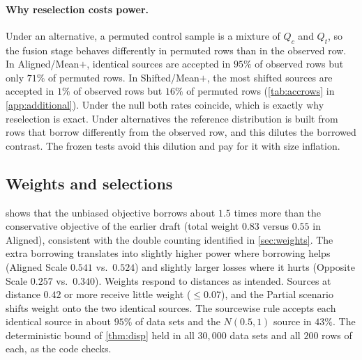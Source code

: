 \paragraph{Why reselection costs power.} Under an alternative, a permuted control sample is a mixture of $Q_c$ and $Q_t$, so the fusion stage behaves differently in permuted rows than in the observed row. In Aligned/Mean$+$, identical sources are accepted in $95\%$ of observed rows but only $71\%$ of permuted rows. In Shifted/Mean$+$, the most shifted sources are accepted in $1\%$ of observed rows but $16\%$ of permuted rows (\cref{tab:accrows} in \cref{app:additional}). Under the null both rates coincide, which is exactly why reselection is exact. Under alternatives the reference distribution is built from rows that borrow differently from the observed row, and this dilutes the borrowed contrast. The frozen tests avoid this dilution and pay for it with size inflation.

\subsection{Weights and selections}\label{sec:weightsres}

\begin{table}[t]
\centering\scriptsize
\caption{Mean selected weights (observed row) for the unbiased (WU) and conservative (WC) objectives, and sourcewise acceptance rates (SW, Bonferroni $\alpha_{f,j}=0.05/3$).}\label{tab:weights}

\end{table}

 shows that the unbiased objective borrows about $1.5$ times more than the conservative objective of the earlier draft (total weight $0.83$ versus $0.55$ in Aligned), consistent with the double counting identified in \cref{sec:weights}. The extra borrowing translates into slightly higher power where borrowing helps (Aligned Scale $0.541$ vs.\ $0.524$) and slightly larger losses where it hurts (Opposite Scale $0.257$ vs.\ $0.340$). Weights respond to distances as intended. Sources at distance $0.42$ or more receive little weight ($\le0.07$), and the Partial scenario shifts weight onto the two identical sources. The sourcewise rule accepts each identical source in about $95\%$ of data sets and the $N(0.5,1)$ source in $43\%$. The deterministic bound of \cref{thm:disp} held in all $30{,}000$ data sets and all $200$ rows of each, as the code checks.



